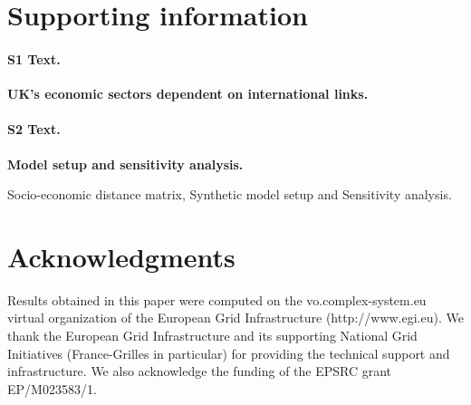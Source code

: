 \documentclass[10pt,letterpaper]{article}
\begin{document}

\section*{Supporting information}

\paragraph*{S1 Text.}
\label{S1_Text}
{\bf UK's economic sectors dependent on international links.}

\paragraph*{S2 Text.}
\label{S2_Text}
{\bf Model setup and sensitivity analysis.}

Socio-economic distance matrix, Synthetic model setup and Sensitivity analysis.



\section*{Acknowledgments}

Results obtained in this paper were computed on the vo.complex-system.eu virtual organization of the European Grid Infrastructure (http://www.egi.eu). We thank the European Grid Infrastructure and its supporting National Grid Initiatives (France-Grilles in particular) for providing the technical support and infrastructure. We also acknowledge the funding of the EPSRC grant EP/M023583/1.




\end{document}
